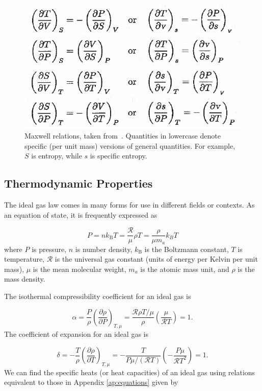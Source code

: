\documentclass[12pt]{article}
\newcommand{\pderiv}[2]{\frac{\partial #1}{\partial #2}}
\newcommand{\bigparenthesis}[1]{\left(#1\right)}
\begin{document}
\begin{figure}[H]
    \centering
    \includegraphics[width=0.5\linewidth]{Appendices//Ideal Gas Law/Maxwell_relations.png}
    \caption{Maxwell relations, taken from~\cite{EracleousPSU}. Quantities in lowercase denote specific (per unit mass) versions of general quantities. For example, $S$ is entropy, while $s$ is specific entropy.}
    \label{fig:MW_relations}
\end{figure}

\subsection{Thermodynamic Properties} \label{ap:ideal_gas_thermo_prop}
The ideal gas law comes in many forms for use in different fields or contexts. As an equation of state, it is frequently expressed as

\begin{equation}
    P = n k_\mathrm{B}T = \frac{\mathcal{R}}{\mu} \rho T = \frac{\rho}{\mu m_a} k_B T
\end{equation}
%
where $P$ is pressure, $n$ is number density, $k_\mathrm{B}$ is the Boltzmann constant, $T$ is temperature, $\mathcal{R}$ is the universal gas constant (units of energy per Kelvin per unit mass), $\mu$ is the mean molecular weight, $m_a$ is the atomic mass unit, and $\rho$ is the mass density.

The isothermal compressibility coefficient for an ideal gas is 

\begin{equation}
    \alpha = \frac{P}{\rho}\bigparenthesis{\pderiv{\rho}{P}}_{T,\mu} =  \frac{\mathcal{R}\rho T/\mu}{\rho} \bigparenthesis{\frac{\mu}{\mathcal{R}T}} = 1.
\end{equation}
%
The coefficient of expansion for an ideal gas is

\begin{equation}
    \delta = -\frac{T}{\rho} \bigparenthesis{\pderiv{\rho}{T}}_{T,\mu} = -\frac{T}{P\mu/(\mathcal{R}T)} \bigparenthesis{-\frac{P\mu}{\mathcal{R}T^2}} = 1.
\end{equation}
%
We can find the specific heats (or heat capacities) of an ideal gas using relations equivalent to those in Appendix \ref{ap:equations} given by
\end{document}

